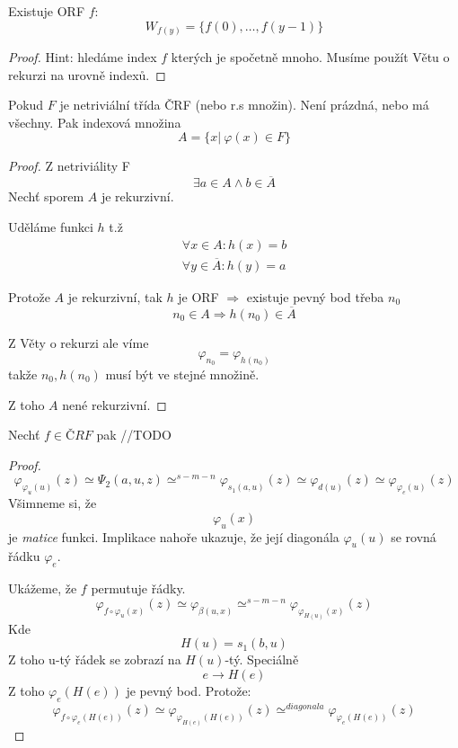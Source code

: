 \begin{theorem}[BD]
	Existuje ORF $f$:
	\[ W_{f(y)} = \{ f(0), \ldots, f(y - 1) \} \]
\end{theorem}
\begin{proof}
	Hint: hledáme index $f$ kterých je spočetně mnoho.
	Musíme použít Větu o rekurzi na urovně indexů.
\end{proof}

\begin{theorem}
	Pokud $F$ je netriviální třída ČRF (nebo r.s množin).
	Není prázdná, nebo má všechny.
	Pak indexová množina
	\[ A = \{ x |\ \varphi(x) \in F \} \]
\end{theorem}
\begin{proof}
	Z netriviálity F
	\[ \exists a \in A \land b \in \overline{A} \]
	Nechť sporem $A$ je rekurzivní.

	Uděláme funkci $h$ t.ž
	\begin{gather*}
		\forall x \in A: h(x) = b \\
		\forall y \in \overline{A}: h(y) = a
	\end{gather*}

	Protože $A$ je rekurzivní, tak $h$ je ORF $\Rightarrow$ existuje pevný bod třeba $n_0$
	\[ n_0 \in A \Rightarrow h(n_0) \in \overline{A} \]

	Z Věty o rekurzi ale víme
	\[ \varphi_{n_0} = \varphi_{h(n_0)} \]
	takže $n_0, h(n_0)$ musí být ve stejné množině.

	Z toho $A$ nené rekurzivní.
\end{proof}

\begin{theorem}[O rekurzi (BD)]
	Nechť $f \in ČRF$ pak
	//TODO
\end{theorem}
\begin{proof}
	\[ \varphi_{\varphi_u(u)} (z) \simeq \Psi_2(a, u, z) \simeq^{s-m-n} \varphi_{s_1(a, u)} (z) \simeq \varphi_{d(u)} (z) \simeq \varphi_{\varphi_e(u)} (z) \]
	Všimneme si, že
	\[ \varphi_u(x) \]
	je \emph{matice} funkci. Implikace nahoře ukazuje, že její diagonála $\varphi_u(u)$ se rovná řádku $\varphi_e$.

	Ukážeme, že $f$ permutuje řádky.
	\[ \varphi_{f \circ \varphi_u (x)} (z) \simeq \varphi_{\beta(u, x)} \simeq^{s-m-n} \varphi_{\varphi_{H(u)}(x)} (z) \]
	Kde
	\[ H(u) = s_1(b, u) \]
	Z toho u-tý řádek se zobrazí na $H(u)$-tý.
	Speciálně
	\[ e \to H(e) \]
	Z toho $\varphi_e(H(e))$ je pevný bod. Protože:
	\[ \varphi_{f \circ \varphi_e(H(e))} (z) \simeq \varphi_{\varphi_{H(e)}(H(e))} (z) \simeq^{diagonala} \varphi_{\varphi_e(H(e))} (z) \]
\end{proof}
